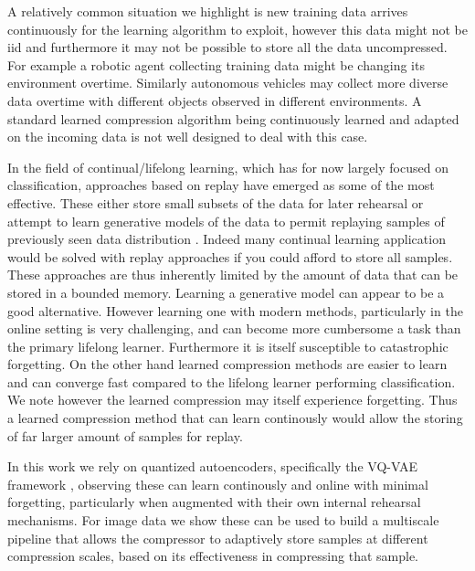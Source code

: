 \documentclass[colorinlistoftodos]{article} %
\begin{document}
A relatively common situation we highlight is new training data arrives continuously for the learning algorithm to exploit, however this data might not be iid and furthermore it may not be possible to store all the data uncompressed. For example a robotic agent collecting training data might be changing its environment overtime. Similarly autonomous vehicles may collect more diverse data overtime with different objects observed in different environments. A standard learned compression algorithm \cite{torfason2018towards} being continuously learned and adapted on the incoming data is not well designed to deal with this case.  

In the field of continual/lifelong learning, which has for now largely focused on classification, approaches based on replay have emerged as some of the most effective. These either store small subsets of the data for later rehearsal or attempt to learn generative models of the data to permit replaying samples of previously seen data distribution \cite{aljundi2019online,chaudhry2019continual,shin2017continual}. Indeed many continual learning application would be solved with replay approaches if you could afford to store all samples. These approaches are thus inherently limited by the amount of data that can be stored in a bounded memory. Learning a generative model can appear to be a good alternative. However learning one with modern methods, particularly in the online setting is very challenging, and can become more cumbersome a task than the primary lifelong learner. Furthermore it is itself susceptible to catastrophic forgetting\cite{aljundi2019online}. On the other hand learned compression methods are easier to learn and can converge fast compared to the lifelong learner performing classification. We note however the learned compression may itself experience forgetting. Thus a learned compression method that can learn continously would allow the storing of far larger amount of samples for replay.

In this work we rely on quantized autoencoders, specifically the VQ-VAE framework \cite{VQVAE}, observing these can learn continously and online with minimal forgetting, particularly when augmented with their own internal rehearsal mechanisms. For image data we show these can be used to build a multiscale pipeline that allows the compressor to adaptively store samples at different compression scales, based on its effectiveness in compressing that sample.    
\end{document}
